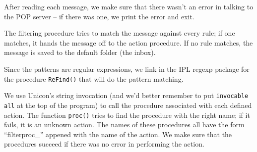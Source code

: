 After reading each message, we make sure that there
wasn't an error in talking to the POP server -- if
there was one, we print the error and exit.

The filtering procedure tries to match the message against every rule;
if one matches, it hands the message off to the action procedure. If no
rule matches, the message is saved to the default folder (the inbox).


Since the patterns are regular expressions, we link in the IPL regexp
package for the procedure \texttt{ReFind()} that will do the pattern
matching.


We use Unicon's string invocation (and
we'd better remember to put \texttt{invocable all} at
the top of the program) to call the procedure associated with each
defined action. The function \texttt{proc()} tries to find the
procedure with the right name; if it fails, it is an unknown action.
The names of these procedures all have the form
{\textquotedblleft}filterproc\_{\textquotedblright} appened with the
name of the action. We make sure that the procedures succeed if there
was no error in performing the action.

